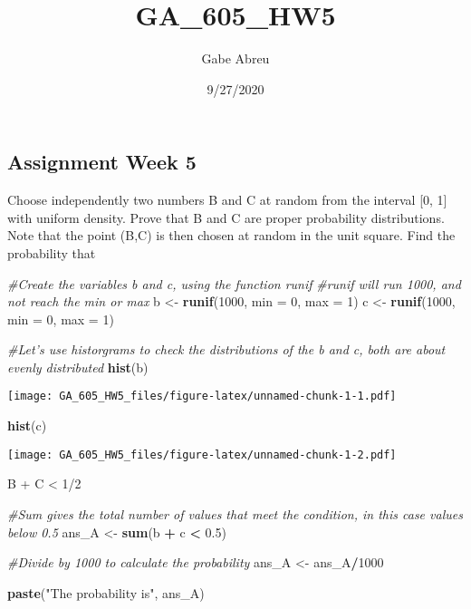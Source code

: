 \documentclass[
]{article}
\title{GA\_605\_HW5}
\author{Gabe Abreu}
\date{9/27/2020}
\newenvironment{Shaded}{\begin{snugshade}}{\end{snugshade}}
\newcommand{\CommentTok}[1]{\textcolor[rgb]{0.56,0.35,0.01}{\textit{#1}}}
\newcommand{\DataTypeTok}[1]{\textcolor[rgb]{0.13,0.29,0.53}{#1}}
\newcommand{\DecValTok}[1]{\textcolor[rgb]{0.00,0.00,0.81}{#1}}
\newcommand{\FloatTok}[1]{\textcolor[rgb]{0.00,0.00,0.81}{#1}}
\newcommand{\KeywordTok}[1]{\textcolor[rgb]{0.13,0.29,0.53}{\textbf{#1}}}
\newcommand{\NormalTok}[1]{#1}
\newcommand{\OperatorTok}[1]{\textcolor[rgb]{0.81,0.36,0.00}{\textbf{#1}}}
\newcommand{\StringTok}[1]{\textcolor[rgb]{0.31,0.60,0.02}{#1}}
\begin{document}
\maketitle

\hypertarget{assignment-week-5}{%
\subsection{Assignment Week 5}\label{assignment-week-5}}

Choose independently two numbers B and C at random from the interval
{[}0, 1{]} with uniform density. Prove that B and C are proper
probability distributions. Note that the point (B,C) is then chosen at
random in the unit square. Find the probability that

\begin{Shaded}
\begin{Highlighting}[]
\CommentTok{#Create the variables b and c, using the function runif}
\CommentTok{#runif will run 1000, and not reach the min or max }
\NormalTok{b <-}\StringTok{ }\KeywordTok{runif}\NormalTok{(}\DecValTok{1000}\NormalTok{, }\DataTypeTok{min =} \DecValTok{0}\NormalTok{, }\DataTypeTok{max =} \DecValTok{1}\NormalTok{)}
\NormalTok{c <-}\StringTok{ }\KeywordTok{runif}\NormalTok{(}\DecValTok{1000}\NormalTok{, }\DataTypeTok{min =} \DecValTok{0}\NormalTok{, }\DataTypeTok{max =} \DecValTok{1}\NormalTok{)}

\CommentTok{#Let's use historgrams to check the distributions of the b and c, both are about evenly distributed}
\KeywordTok{hist}\NormalTok{(b)}
\end{Highlighting}
\end{Shaded}

\texttt{[image: GA\_605\_HW5\_files/figure-latex/unnamed-chunk-1-1.pdf]}

\begin{Shaded}
\begin{Highlighting}[]
\KeywordTok{hist}\NormalTok{(c)}
\end{Highlighting}
\end{Shaded}

\texttt{[image: GA\_605\_HW5\_files/figure-latex/unnamed-chunk-1-2.pdf]}

B + C \textless{} 1/2

\begin{Shaded}
\begin{Highlighting}[]
\CommentTok{#Sum gives the total number of values that meet the condition, in this case values below 0.5}
\NormalTok{ans_A <-}\StringTok{ }\KeywordTok{sum}\NormalTok{(b }\OperatorTok{+}\StringTok{ }\NormalTok{c }\OperatorTok{<}\StringTok{ }\FloatTok{0.5}\NormalTok{)}

\CommentTok{#Divide by 1000 to calculate the probability}
\NormalTok{ans_A <-}\StringTok{ }\NormalTok{ans_A}\OperatorTok{/}\DecValTok{1000}

\KeywordTok{paste}\NormalTok{(}\StringTok{"The probability is"}\NormalTok{, ans_A)}
\end{Highlighting}
\end{Shaded}
\end{document}
